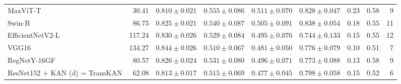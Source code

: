 \begin{table}[t]
\begin{tabular}{lrccccccr}
MaxViT-T & 30.41 & $0.810 \pm 0.021$ & $0.555 \pm 0.086$ & $0.511 \pm 0.070$ & $0.828 \pm 0.047$ & 0.23 & 0.58 & 9 \\
Swin-B & 86.75 & $0.825 \pm 0.021$ & $0.540 \pm 0.087$ & $0.505 \pm 0.091$ & $0.838 \pm 0.054$ & 0.18 & 0.55 & 11 \\
EfficientNetV2-L & 117.24 & $0.830 \pm 0.026$ & $0.529 \pm 0.084$ & $0.495 \pm 0.076$ & $0.744 \pm 0.133$ & 0.15 & 0.55 & 12 \\
VGG16 & 134.27 & $0.844 \pm 0.026$ & $0.510 \pm 0.067$ & $0.481 \pm 0.050$ & $0.776 \pm 0.079$ & 0.10 & 0.51 & 7 \\
RegNetY-16GF & 80.57 & $0.826 \pm 0.024$ & $0.531 \pm 0.080$ & $0.496 \pm 0.071$ & $0.773 \pm 0.088$ & 0.13 & 0.58 & 9 \\
ResNet152 + KAN (d) = TransKAN & 62.08 & $0.813 \pm 0.017$ & $0.515 \pm 0.069$ & $0.477 \pm 0.045$ & $0.798 \pm 0.058$ & 0.15 & 0.52 & 6 \\
\hline
\end{tabular}
\end{table}
